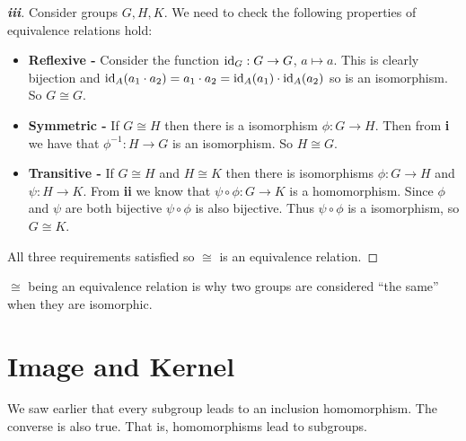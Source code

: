 \documentclass[../main.tex]{subfiles}
\begin{document}
\begin{proof}[\textbf{iii}]
  Consider groups $G, H, K$.
  We need to check the following properties of equivalence relations hold:
  \begin{itemize}
    \item \textbf{Reflexive -} Consider the function $\mathrm{id}_G: G \to G$, $a \mapsto a$.
      This is clearly bijection and $\mathrm{id}_A(a_1 \cdot a_2) = a_1 \cdot a_2 = \mathrm{id}_A(a_1) \cdot \mathrm{id}_A(a_2)$ so is an isomorphism.
      So $G \cong G$.
    \item \textbf{Symmetric -} If $G \cong H$ then there is a isomorphism $\phi: G \to H$.
      Then from \textbf{i} we have that $\phi^{-1}: H \to G$ is an isomorphism.
      So $H \cong G$.
    \item \textbf{Transitive -} If $G \cong H$ and $H \cong K$ then there is isomorphisms $\phi: G \to H$ and $\psi: H \to K$.
      From \textbf{ii} we know that $\psi \circ \phi: G \to K$ is a homomorphism.
      Since $\phi$ and $\psi$ are both bijective $\psi \circ \phi$ is also bijective.
      Thus $\psi \circ \phi$ is a isomorphism, so $G \cong K$.
  \end{itemize}
  All three requirements satisfied so $\cong$ is an equivalence relation.
\end{proof}
\begin{remark}
  $\cong$ being an equivalence relation is why two groups are considered ``the same'' when they are isomorphic.
\end{remark}
\section{Image and Kernel}
We saw earlier that every subgroup leads to an inclusion homomorphism.
The converse is also true.
That is, homomorphisms lead to subgroups.
\end{document}
